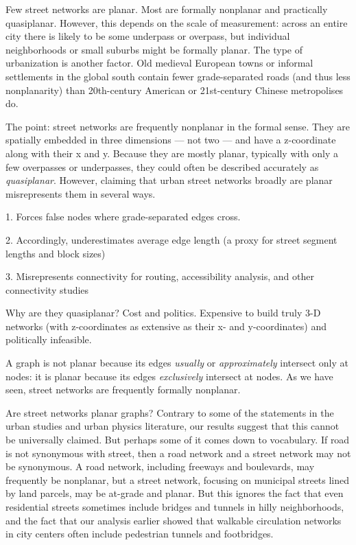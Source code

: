 \documentclass[Afour,sageh,times]{sagej}
\begin{document}
Few street networks are planar. Most are formally nonplanar and practically quasiplanar. However, this depends on the scale of measurement: across an entire city there is likely to be some underpass or overpass, but individual neighborhoods or small suburbs might be formally planar. The type of urbanization is another factor. Old medieval European towns or informal settlements in the global south contain fewer grade-separated roads (and thus less nonplanarity) than 20th-century American or 21st-century Chinese metropolises do.

The point: street networks are frequently nonplanar in the formal sense. They are spatially embedded in three dimensions --- not two --- and have a z-coordinate along with their x and y. Because they are mostly planar, typically with only a few overpasses or underpasses, they could often be described accurately as \emph{quasiplanar}. However, claiming that urban street networks broadly are planar misrepresents them in several ways.

1. Forces false nodes where grade-separated edges cross.

2. Accordingly, underestimates average edge length (a proxy for street segment lengths and block sizes)

3. Misrepresents connectivity for routing, accessibility analysis, and other connectivity studies

Why are they quasiplanar? Cost and politics. Expensive to build truly 3-D networks (with z-coordinates as extensive as their x- and y-coordinates) and politically infeasible.

A graph is not planar because its edges \emph{usually} or \emph{approximately} intersect only at nodes: it is planar because its edges \emph{exclusively} intersect at nodes. As we have seen, street networks are frequently formally nonplanar. 

Are street networks planar graphs? Contrary to some of the statements in the urban studies and urban physics literature, our results suggest that this cannot be universally claimed. But perhaps some of it comes down to vocabulary. If road is not synonymous with street, then a road network and a street network may not be synonymous. A road network, including freeways and boulevards, may frequently be nonplanar, but a street network, focusing on municipal streets lined by land parcels, may be at-grade and planar. But this ignores the fact that even residential streets sometimes include bridges and tunnels in hilly neighborhoods, and the fact that our analysis earlier showed that walkable circulation networks in city centers often include pedestrian tunnels and footbridges.
\end{document}
